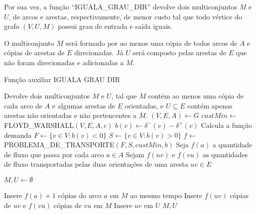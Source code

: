     Por sua vez, a função ``IGUALA\_GRAU\_DIR'' devolve dois multiconjuntos $M$ e $U$, de arcos e arestas, respectivamente, de menor custo tal que todo vértice do grafo $(V, U, M)$ possui grau de entrada e saída iguais.

    O multiconjunto $M$ será formado por ao menos uma cópia de todos arcos de $A$ e cópias de arestas de $E$ direcionadas.
    Já $U$ será composto pelas arestas de $E$ que não foram direcionadas e adicionadas a $M$.


    \begin{algorithm}
        \caption{Função auxiliar IGUALA GRAU DIR}
        \label{mixed-iguala-grau-dir}
        \begin{algorithmic}[1]
        \State \Comment Devolve dois multiconjuntos $M$ e $U$, tal que $M$ contém ao menos uma cópia de cada arco de $A$ e algumas arestas de $E$ orientadas, e $U \subseteq E$ contém apenas arestas não orientadas e não pertencentes a $M$.
            \State $(V, E, A) \gets G$
            \State $custMin \gets $ FLOYD\_WARSHALL$(V, E, A, c)$
                \State $b(v) \gets \delta^-(v) - \delta^+(v)$ \Comment Calcula a função demanda
            \EndFor
            \State $F \gets \{v \in V : b(v) < 0\}$
            \State $S \gets \{v \in V : b(v) > 0\}$
            \State $f \gets $ PROBLEMA\_DE\_TRANSPORTE$(F, S, custMin, b)$
            \State Seja $f(a)$ a quantidade de fluxo que passa por cada arco $a \in A$ 
            \State Sejam $f(uv)$ e $f(vu)$ as quantidades de fluxo transportadas pelas duas orientações de uma aresta $uv \in E$

            \State $M, U \gets \emptyset$

            \State Insere $f(a) + 1$ cópias do arco $a$ em $M$
            \EndFor
          ao mesmo tempo %
    \State Insere $f(uv)$ cópias de $uv$ e $f(vu)$ cópias de $vu$ em $M$
                \Else 
                    \State Insere $uv$ em $U$ 
                \EndIf
            \EndFor
            \State \Return $M, U$
        \EndFunction
        \end{algorithmic}
    \end{algorithm}

